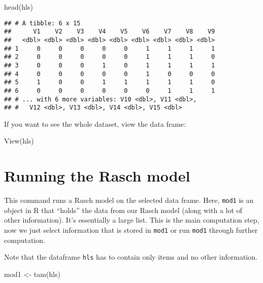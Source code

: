 \documentclass[
]{book}
\newenvironment{Shaded}{\begin{snugshade}}{\end{snugshade}}
\newcommand{\FunctionTok}[1]{\textcolor[rgb]{0.00,0.00,0.00}{#1}}
\newcommand{\NormalTok}[1]{#1}
\newcommand{\OtherTok}[1]{\textcolor[rgb]{0.56,0.35,0.01}{#1}}
\begin{document}
\begin{Shaded}
\begin{Highlighting}[]
\FunctionTok{head}\NormalTok{(hls)}
\end{Highlighting}
\end{Shaded}

\begin{verbatim}
## # A tibble: 6 x 15
##      V1    V2    V3    V4    V5    V6    V7    V8    V9
##   <dbl> <dbl> <dbl> <dbl> <dbl> <dbl> <dbl> <dbl> <dbl>
## 1     0     0     0     0     0     1     1     1     1
## 2     0     0     0     0     0     1     1     1     0
## 3     0     0     0     1     0     1     1     1     1
## 4     0     0     0     0     0     1     0     0     0
## 5     1     0     0     1     1     1     1     1     0
## 6     0     0     0     0     0     0     1     1     1
## # ... with 6 more variables: V10 <dbl>, V11 <dbl>,
## #   V12 <dbl>, V13 <dbl>, V14 <dbl>, V15 <dbl>
\end{verbatim}

If you want to see the whole dataset, view the data frame:

\begin{Shaded}
\begin{Highlighting}[]
\FunctionTok{View}\NormalTok{(hls)}
\end{Highlighting}
\end{Shaded}

\hypertarget{running-the-rasch-model}{%
\section{Running the Rasch model}\label{running-the-rasch-model}}

This command runs a Rasch model on the selected data frame. Here, \texttt{mod1} is an object in R that ``holds'' the data from our Rasch model (along with a lot of other information). It's essentially a large list. This is the main computation step, now we just select information that is stored in \texttt{mod1} or run \texttt{mod1} through further computation.

Note that the dataframe \texttt{hls} has to contain only items and no other information.

\begin{Shaded}
\begin{Highlighting}[]
\NormalTok{mod1 }\OtherTok{\textless{}{-}} \FunctionTok{tam}\NormalTok{(hls)}
\end{Highlighting}
\end{Shaded}
\end{document}
